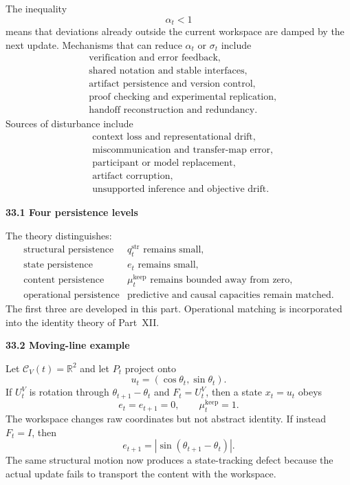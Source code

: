 \documentclass[11pt,letterpaper]{article}
\newcommand{\subtopic}[1]{%
 \vspace{0.45em}
 {\bfseries\color{AccentColor} #1\par}
}
\theoremstyle{plain}
\theoremstyle{definition}
\begin{document}
The inequality
\[
\alpha_t<1
\]
means that deviations already outside the current workspace are damped by the
next update. Mechanisms that can reduce \(\alpha_t\) or \(\sigma_t\) include
\[
\begin{aligned}
&\text{verification and error feedback},\\
&\text{shared notation and stable interfaces},\\
&\text{artifact persistence and version control},\\
&\text{proof checking and experimental replication},\\
&\text{handoff reconstruction and redundancy}.
\end{aligned}
\]
Sources of disturbance include
\[
\begin{aligned}
&\text{context loss and representational drift},\\
&\text{miscommunication and transfer-map error},\\
&\text{participant or model replacement},\\
&\text{artifact corruption},\\
&\text{unsupported inference and objective drift}.
\end{aligned}
\]

\subtopic{33.1 Four persistence levels}

The theory distinguishes:
\[
\begin{array}{ll}
\text{structural persistence}
& q_t^{\mathrm{str}}\text{ remains small},\\
\text{state persistence}
& e_t\text{ remains small},\\
\text{content persistence}
& \mu_t^{\mathrm{keep}}\text{ remains bounded away from zero},\\
\text{operational persistence}
& \text{predictive and causal capacities remain matched}.
\end{array}
\]
The first three are developed in this part. Operational matching is incorporated
into the identity theory of Part~XII.

\subtopic{33.2 Moving-line example}

Let \(\mathcal C_V(t)=\mathbb R^2\) and let \(P_t\) project onto
\[
u_t=(\cos\theta_t,\sin\theta_t).
\]
If \(U_t^V\) is rotation through
\(\theta_{t+1}-\theta_t\) and \(F_t=U_t^V\), then a state
\(x_t=u_t\) obeys
\[
e_t=e_{t+1}=0,
\qquad
\mu_t^{\mathrm{keep}}=1.
\]
The workspace changes raw coordinates but not abstract identity. If instead
\(F_t=I\), then
\[
e_{t+1}
=
|\sin(\theta_{t+1}-\theta_t)|.
\]
The same structural motion now produces a state-tracking defect because the
actual update fails to transport the content with the workspace.
\end{document}
